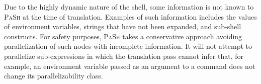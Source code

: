 \documentclass[sigplan, review, screen, anonymous]{acmart}
\newcommand{\cn}[1]{\mbox{\textcircled{\footnotesize #1}}}
\newcommand{\sta}{\cn{\textsc{S}}\xspace}
\newcommand{\pur}{\cn{\textsc{P}}\xspace}
\newcommand{\kk}[1]{[{\color{magenta}kk: #1}]}
\newcommand{\sx}[1]{(\S\ref{#1})}
\newcommand{\sys}{{\scshape PaSh}\xspace}
\begin{document}


Due to the highly dynamic nature of the shell, some information is not known to \sys at the time of translation.
Examples of such information includes the values of environment variables, strings that have not been expanded, and sub-shell constructs.
For safety purposes, \sys takes a conservative approach avoiding parallelization of such nodes with incomplete information.
It will not attempt to parallelize sub-expressions in which the translation pass cannot infer that, for example, an environment variable passed as an argument to a command does not change its parallelizability class.








\end{document}
